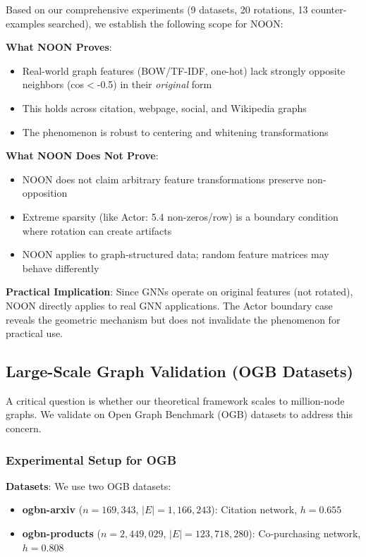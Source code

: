 \begin{remark}
\label{rem:noon_scope}
Based on our comprehensive experiments (9 datasets, 20 rotations, 13 counter-examples searched), we establish the following scope for NOON:

\textbf{What NOON Proves}:
\begin{itemize}
    \item Real-world graph features (BOW/TF-IDF, one-hot) lack strongly opposite neighbors (cos$<$-0.5) in their \textit{original} form
    \item This holds across citation, webpage, social, and Wikipedia graphs
    \item The phenomenon is robust to centering and whitening transformations
\end{itemize}

\textbf{What NOON Does Not Prove}:
\begin{itemize}
    \item NOON does not claim arbitrary feature transformations preserve non-opposition
    \item Extreme sparsity (like Actor: 5.4 non-zeros/row) is a boundary condition where rotation can create artifacts
    \item NOON applies to graph-structured data; random feature matrices may behave differently
\end{itemize}

\textbf{Practical Implication}: Since GNNs operate on original features (not rotated), NOON directly applies to real GNN applications. The Actor boundary case reveals the geometric mechanism but does not invalidate the phenomenon for practical use.
\end{remark}

\subsection{Large-Scale Graph Validation (OGB Datasets)}
\label{sec:ogb_experiments}

A critical question is whether our theoretical framework scales to million-node graphs. We validate on Open Graph Benchmark (OGB) datasets to address this concern.

\subsubsection{Experimental Setup for OGB}

\textbf{Datasets}: We use two OGB datasets:
\begin{itemize}
    \item \textbf{ogbn-arxiv} ($n=169,343$, $|E|=1,166,243$): Citation network, $h=0.655$
    \item \textbf{ogbn-products} ($n=2,449,029$, $|E|=123,718,280$): Co-purchasing network, $h=0.808$
\end{itemize}

